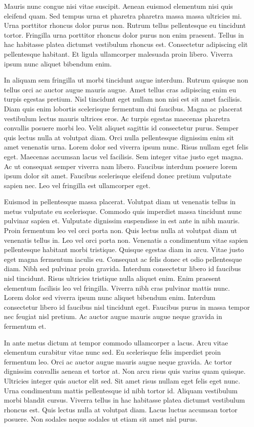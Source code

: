 \documentclass[
]{scrbook}
\begin{document}
Mauris nunc congue nisi vitae suscipit. Aenean euismod elementum nisi quis eleifend quam. Sed tempus urna et pharetra pharetra massa massa ultricies mi. Urna porttitor rhoncus dolor purus non. Rutrum tellus pellentesque eu tincidunt tortor. Fringilla urna porttitor rhoncus dolor purus non enim praesent. Tellus in hac habitasse platea dictumst vestibulum rhoncus est. Consectetur adipiscing elit pellentesque habitant. Et ligula ullamcorper malesuada proin libero. Viverra ipsum nunc aliquet bibendum enim.

In aliquam sem fringilla ut morbi tincidunt augue interdum. Rutrum quisque non tellus orci ac auctor augue mauris augue. Amet tellus cras adipiscing enim eu turpis egestas pretium. Nisl tincidunt eget nullam non nisi est sit amet facilisis. Diam quis enim lobortis scelerisque fermentum dui faucibus. Magna ac placerat vestibulum lectus mauris ultrices eros. Ac turpis egestas maecenas pharetra convallis posuere morbi leo. Velit aliquet sagittis id consectetur purus. Semper quis lectus nulla at volutpat diam. Orci nulla pellentesque dignissim enim sit amet venenatis urna. Lorem dolor sed viverra ipsum nunc. Risus nullam eget felis eget. Maecenas accumsan lacus vel facilisis. Sem integer vitae justo eget magna. Ac ut consequat semper viverra nam libero. Faucibus interdum posuere lorem ipsum dolor sit amet. Faucibus scelerisque eleifend donec pretium vulputate sapien nec. Leo vel fringilla est ullamcorper eget.

Euismod in pellentesque massa placerat. Volutpat diam ut venenatis tellus in metus vulputate eu scelerisque. Commodo quis imperdiet massa tincidunt nunc pulvinar sapien et. Vulputate dignissim suspendisse in est ante in nibh mauris. Proin fermentum leo vel orci porta non. Quis lectus nulla at volutpat diam ut venenatis tellus in. Leo vel orci porta non. Venenatis a condimentum vitae sapien pellentesque habitant morbi tristique. Quisque egestas diam in arcu. Vitae justo eget magna fermentum iaculis eu. Consequat ac felis donec et odio pellentesque diam. Nibh sed pulvinar proin gravida. Interdum consectetur libero id faucibus nisl tincidunt. Risus ultricies tristique nulla aliquet enim. Enim praesent elementum facilisis leo vel fringilla. Viverra nibh cras pulvinar mattis nunc. Lorem dolor sed viverra ipsum nunc aliquet bibendum enim. Interdum consectetur libero id faucibus nisl tincidunt eget. Faucibus purus in massa tempor nec feugiat nisl pretium. Ac auctor augue mauris augue neque gravida in fermentum et.

In ante metus dictum at tempor commodo ullamcorper a lacus. Arcu vitae elementum curabitur vitae nunc sed. Eu scelerisque felis imperdiet proin fermentum leo. Orci ac auctor augue mauris augue neque gravida. Ac tortor dignissim convallis aenean et tortor at. Non arcu risus quis varius quam quisque. Ultricies integer quis auctor elit sed. Sit amet risus nullam eget felis eget nunc. Urna condimentum mattis pellentesque id nibh tortor id. Aliquam vestibulum morbi blandit cursus. Viverra tellus in hac habitasse platea dictumst vestibulum rhoncus est. Quis lectus nulla at volutpat diam. Lacus luctus accumsan tortor posuere. Non sodales neque sodales ut etiam sit amet nisl purus.
\end{document}
